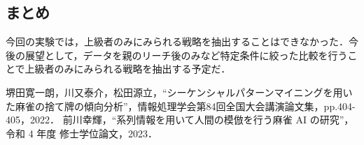 \documentclass[a4j]{jarticle}
\begin{document}
\begin{Abstract}
\section{まとめ}
 今回の実験では，上級者のみにみられる戦略を抽出することはできなかった．今後の展望として，データを親のリーチ後のみなど特定条件に絞った比較を行うことで上級者のみにみられる戦略を抽出する予定だ．
 

\begin{thebibliography}{99}
 堺田寛一朗，川又泰介，松田源立，“シーケンシャルパターンマイニングを用いた麻雀の捨て牌の傾向分析”，情報処理学会第84回全国大会講演論文集，pp.404-405，2022．
	前川幸輝，“系列情報を用いて人間の模倣を行う麻雀 AI の研究”，令和 4 年度 修士学位論文，2023．
\end{thebibliography}

\end{Abstract}
\end{document}
